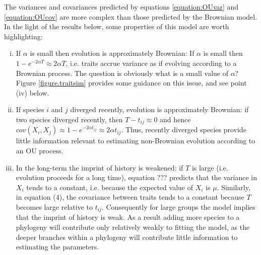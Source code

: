 \documentclass[a4paper,12pt]{article}
\begin{document}
The variances and covariances predicted by equations \ref{equation:OUvar} and \ref{equation:OUcov} are more complex than those predicted by the Brownian model. In the light of the results below, some properties of this model are worth highlighting:

\begin{enumerate}[(i)]
  
  \item If $\alpha$ is small then evolution is approximately Brownian: If $\alpha$ is small then $1 - e^{-2\alpha T} \approx 2\alpha T$, i.e. traits accrue variance as if evolving according to a Brownian process. The question is obviously what is a small value of $\alpha$? Figure \ref{figure.traitsim} provides some guidance on this issue, and see point (iv) below.\\ 

  \item If species $i$ and $j$ diverged recently, evolution is approximately Brownian: if two species diverged recently, then $T - t_{ij} \approx 0$ and hence $cov(X_i, X_j) \approx 1 - e^{-2\alpha t_{ij}} \approx 2\alpha t_{ij}$. Thus, recently diverged species provide little information relevant to estimating non-Brownian evolution according to an OU process. \\ 

  \item In the long-term the imprint of history is weakened: if $T$ is large (i.e. evolution proceeds for a long time), equation ??? predicts that the variance in $X_i$ tends to a constant, i.e. because the expected value of $X_i$ is $\mu$. Similarly, in equation (4), the covariance between traits tends to a constant because $T$ becomes large relative to $t_{ij}$. Consequently for large groups the model implies that the imprint of history is weak. As a result adding more species to a phylogeny will contribute only relatively weakly to fitting the model, as the deeper branches within a phylogeny will contribute little information to estimating the parameters.\\

\end{enumerate}
\end{document}
